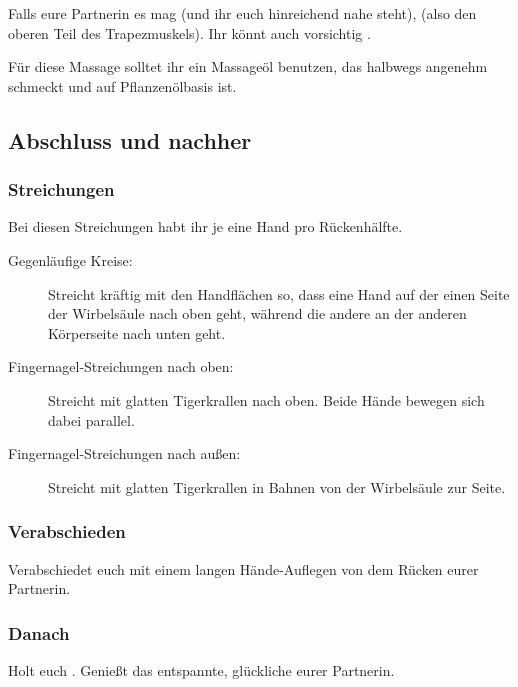 Falls eure Partnerin es mag (und ihr euch hinreichend nahe steht),  (also den oberen Teil des Trapezmuskels). Ihr könnt auch vorsichtig .

Für diese Massage solltet ihr ein Massageöl benutzen, das halbwegs angenehm schmeckt und auf Pflanzenölbasis ist.


\subsection{Abschluss und nachher}

\subsubsection{Streichungen}

Bei diesen Streichungen habt ihr je eine Hand pro Rückenhälfte.

\begin{description}
  \item [Gegenläufige Kreise:] Streicht kräftig mit den Handflächen so, dass eine Hand auf der einen Seite der Wirbelsäule nach oben geht, während die andere an der anderen Körperseite nach unten geht.
  \item [Fingernagel-Streichungen nach oben:] Streicht mit glatten Tigerkrallen  nach oben. Beide Hände bewegen sich dabei parallel.
  \item [Fingernagel-Streichungen nach außen:] Streicht mit glatten Tigerkrallen in Bahnen von der Wirbelsäule zur Seite.
\end{description}


\subsubsection{Verabschieden}

Verabschiedet euch mit einem langen Hände-Auflegen von dem Rücken eurer Partnerin.

\subsubsection{Danach}
 Holt euch . Genießt das entspannte, glückliche  eurer Partnerin.
